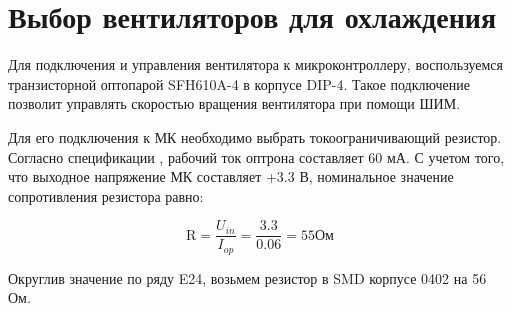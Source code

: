 \section {Выбор вентиляторов для охлаждения}

Для подключения и управления вентилятора к микроконтроллеру, воспользуемся транзисторной оптопарой SFH610A-4 в корпусе DIP-4. Такое подключение позволит управлять скоростью вращения вентилятора при помощи ШИМ.

Для его подключения к МК необходимо выбрать токоограничивающий резистор. Согласно спецификации \cite{datasheet::Optocoupler}, рабочий ток оптрона составляет 60 мА. С учетом того, что выходное напряжение МК составляет +3.3 В, номинальное значение сопротивления резистора равно:

$$
\text{R} = \frac{U_{in}}{I_{op}} = \frac{3.3}{0.06} = 55 \text{Ом}
$$

Округлив значение по ряду E24, возьмем резистор в SMD корпусе 0402 на 56 Ом.
